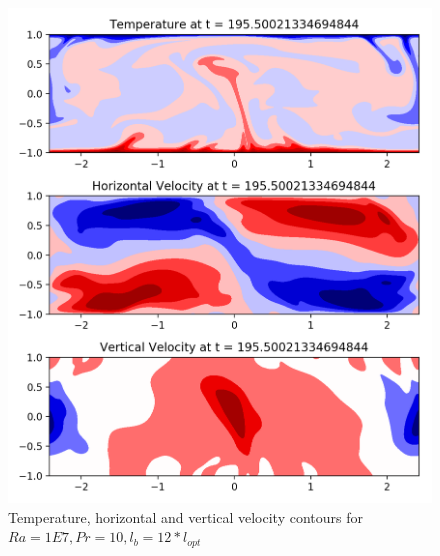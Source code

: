 \documentclass[12pt]{article}
\begin{document}
     \begin{figure}[!htb]
     	\includegraphics[width=\linewidth]{contours_1E7_10_12.png}
     	\caption{Temperature, horizontal and vertical velocity contours for $Ra = 1E7, Pr =10, l_b = 12* l_{opt} $ }
     	\label{fig:fig21}
     \end{figure}
     
\end{document}
